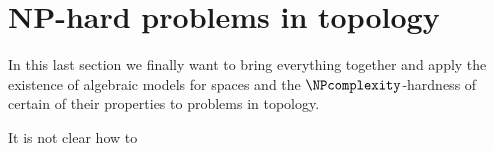 \section{NP-hard problems in topology}

In this last section we finally want to bring everything together and apply the existence of algebraic
models for spaces and the $\NPcomplexity$-hardness of certain of their properties to problems in topology.

\begin{Remark}
 It is not clear how to 
\end{Remark}
